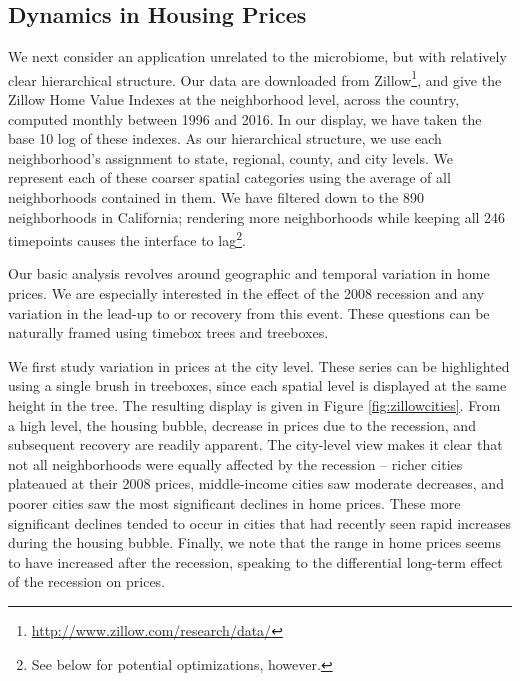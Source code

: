 \documentclass[12pt]{article}
\begin{document}
\subsection{Dynamics in Housing Prices}\label{zillow-study}

We next consider an application unrelated to the microbiome, but with
relatively clear hierarchical structure. Our data are downloaded from
Zillow\footnote{\url{http://www.zillow.com/research/data/}}, and give
the Zillow Home Value Indexes at the neighborhood level, across the
country, computed monthly between 1996 and 2016. In our display, we have
taken the base 10 log of these indexes. As our hierarchical structure,
we use each neighborhood's assignment to state, regional, county, and
city levels. We represent each of these coarser spatial categories using
the average of all neighborhoods contained in them. We have filtered
down to the 890 neighborhoods in California; rendering more
neighborhoods while keeping all 246 timepoints causes the interface to
lag\footnote{See below for potential optimizations, however.}.

Our basic analysis revolves around geographic and temporal variation in
home prices. We are especially interested in the effect of the 2008
recession and any variation in the lead-up to or recovery from this
event. These questions can be naturally framed using timebox trees and
treeboxes.

We first study variation in prices at the city level. These series can
be highlighted using a single brush in treeboxes, since each spatial
level is displayed at the same height in the tree. The resulting display
is given in Figure \ref{fig:zillowcities}. From a high level, the
housing bubble, decrease in prices due to the recession, and subsequent
recovery are readily apparent. The city-level view makes it clear that
not all neighborhoods were equally affected by the recession -- richer
cities plateaued at their 2008 prices, middle-income cities saw moderate
decreases, and poorer cities saw the most significant declines in home
prices. These more significant declines tended to occur in cities that
had recently seen rapid increases during the housing bubble. Finally, we
note that the range in home prices seems to have increased after the
recession, speaking to the differential long-term effect of the
recession on prices.
\end{document}

